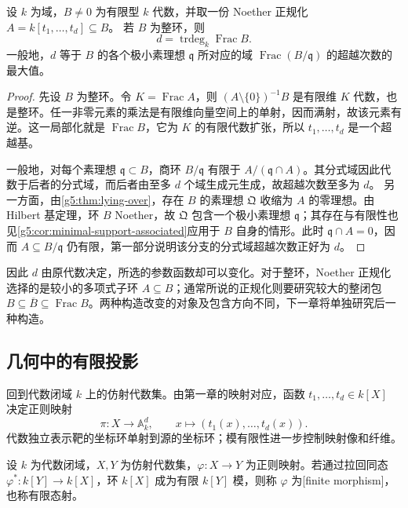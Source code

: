 \begin{corollary}\label{g5:cor:normalization-transcendence}
	设 \(k\) 为域，\(B\ne0\) 为有限型 \(k\) 代数，并取一份 Noether 正规化
	\(A=k[t_1,\ldots,t_d]\subseteq B\)。
	若 \(B\) 为整环，则
	\[
	d=\operatorname{trdeg}_k\operatorname{Frac}B.
	\]
	一般地，\(d\) 等于 \(B\) 的各个极小素理想 \(\mathfrak q\) 所对应的域
	\(\operatorname{Frac}(B/\mathfrak q)\)
	的超越次数的最大值。
\end{corollary}
\begin{proof}
	先设 \(B\) 为整环。令 \(K=\operatorname{Frac}A\)，则
	\((A\setminus\{0\})^{-1}B\)
	是有限维 \(K\) 代数，也是整环。任一非零元素的乘法是有限维向量空间上的单射，因而满射，故该元素有逆。这一局部化就是 \(\operatorname{Frac}B\)，它为 \(K\) 的有限代数扩张，所以 \(t_1,\ldots,t_d\) 是一个超越基。

	一般地，对每个素理想 \(\mathfrak q\subset B\)，商环 \(B/\mathfrak q\) 有限于
	\(A/(\mathfrak q\cap A)\)。其分式域因此代数于后者的分式域，而后者由至多 \(d\) 个域生成元生成，故超越次数至多为 \(d\)。
	另一方面，由\cref{g5:thm:lying-over}，存在 \(B\) 的素理想 \(\mathfrak Q\) 收缩为 \(A\) 的零理想。由 Hilbert 基定理，环 \(B\) Noether，故 \(\mathfrak Q\) 包含一个极小素理想 \(\mathfrak q\)；其存在与有限性也见\cref{g5:cor:minimal-support-associated}应用于 \(B\) 自身的情形。此时 \(\mathfrak q\cap A=0\)，因而 \(A\subseteq B/\mathfrak q\) 仍有限，第一部分说明该分支的分式域超越次数正好为 \(d\)。
\end{proof}

因此 \(d\) 由原代数决定，所选的参数函数却可以变化。对于整环，Noether 正规化选择的是较小的多项式子环 \(A\subseteq B\)；通常所说的正规化则要研究较大的整闭包 \(B\subseteq\overline B\subseteq\operatorname{Frac}B\)。两种构造改变的对象及包含方向不同，下一章将单独研究后一种构造。

\subsection{几何中的有限投影}
\label{g5:subsec:0302:05}

回到代数闭域 \(k\) 上的仿射代数集。由第一章的映射对应，函数 \(t_1,\ldots,t_d\in k[X]\) 决定正则映射
\[
	\pi:X\longrightarrow\mathbb A_k^d,\qquad
	x\longmapsto(t_1(x),\ldots,t_d(x)).
\]
代数独立表示靶的坐标环单射到源的坐标环；模有限性进一步控制映射像和纤维。

\begin{definition}\label{g5:def:finite-affine-morphism}
	设 \(k\) 为代数闭域，\(X,Y\) 为仿射代数集，\(\varphi:X\to Y\) 为正则映射。若通过拉回同态
	\(\varphi^*:k[Y]\to k[X]\)，环 \(k[X]\) 成为有限 \(k[Y]\) 模，则称 \(\varphi\) 为[finite morphism]，也称有限态射。
\end{definition}

